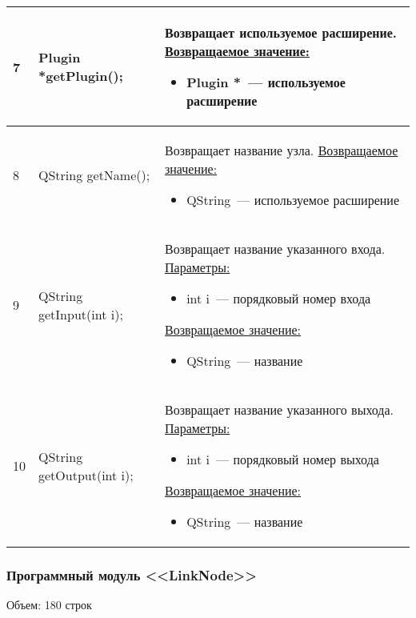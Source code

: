 \begin{longtable}[h]{|p{}|p{}|p{}|}
  7 & Plugin *getPlugin(); & Возвращает используемое расширение.\newline
    \uline{Возвращаемое значение:}
    \begin{itemize}[nolistsep,label=,leftmargin=0cm]
      \item Plugin *~--- используемое расширение
    \end{itemize}\\ \hline
  8 & QString getName(); & Возвращает название узла.\newline
    \uline{Возвращаемое значение:}
    \begin{itemize}[nolistsep,label=,leftmargin=0cm]
      \item QString~--- используемое расширение
    \end{itemize}\\ \hline
  9 & QString getInput(int i); & Возвращает название указанного входа.\newline
    \uline{Параметры:}
    \begin{itemize}[nolistsep,label=,leftmargin=0cm]
      \item int i~--- порядковый номер входа
    \end{itemize}
    \uline{Возвращаемое значение:}
    \begin{itemize}[nolistsep,label=,leftmargin=0cm]
      \item QString~--- название
    \end{itemize}\\ \hline
  10 & QString getOutput(int i); & Возвращает название указанного выхода.\newline
    \uline{Параметры:}
    \begin{itemize}[nolistsep,label=,leftmargin=0cm]
      \item int i~--- порядковый номер выхода
    \end{itemize}
    \uline{Возвращаемое значение:}
    \begin{itemize}[nolistsep,label=,leftmargin=0cm]
      \item QString~--- название
    \end{itemize}\\ \hline
\end{longtable}
\normalsize
\onehalfspacing

\subsubsection*{Программный модуль <<LinkNode>>}
Объем: 180 строк

